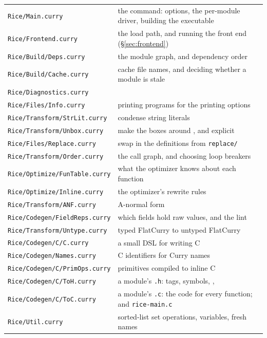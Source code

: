 \documentclass[11pt]{article}
\newcommand{\code}[1]{\texttt{\detokenize{#1}}}
\newcommand{\file}[1]{\nolinkurl{#1}}
\begin{document}
\begin{longtable}{@{}p{}p{}@{}}
\toprule
\file{Rice/Main.curry} & the \code{rice} command: options, the per-module
  driver, building the executable \\
\file{Rice/Frontend.curry} & the load path, and running the front end
  (\S\ref{sec:frontend}) \\
\file{Rice/Build/Deps.curry} & the module graph, and dependency order \\
\file{Rice/Build/Cache.curry} & cache file names, and deciding whether a module
  is stale \\
\file{Rice/Diagnostics.curry} & \code{--compiler-time} \\
\file{Rice/Files/Info.curry} & printing programs for the printing options \\
\file{Rice/Transform/StrLit.curry} & condense string literals \\
\file{Rice/Transform/Unbox.curry} & make the boxes around \code{Int},
  \code{Char} and \code{Float} explicit \\
\file{Rice/Files/Replace.curry} & swap in the definitions from \file{replace/} \\
\file{Rice/Transform/Order.curry} & the call graph, and choosing loop breakers \\
\file{Rice/Optimize/FunTable.curry} & what the optimizer knows about each
  function \\
\file{Rice/Optimize/Inline.curry} & the optimizer's rewrite rules \\
\file{Rice/Transform/ANF.curry} & A-normal form \\
\file{Rice/Codegen/FieldReps.curry} & which fields hold raw values, and the lint \\
\file{Rice/Transform/Untype.curry} & typed FlatCurry to untyped FlatCurry \\
\file{Rice/Codegen/C/C.curry} & a small DSL for writing C \\
\file{Rice/Codegen/Names.curry} & C identifiers for Curry names \\
\file{Rice/Codegen/C/PrimOps.curry} & primitives compiled to inline C \\
\file{Rice/Codegen/C/ToH.curry} & a module's \file{.h}: tags, symbols,
  \code{make_X}, \code{set_X} \\
\file{Rice/Codegen/C/ToC.curry} & a module's \file{.c}: the code for every
  function; and \file{rice-main.c} \\
\file{Rice/Util.curry} & sorted-list set operations, variables, fresh names \\
\bottomrule
\end{longtable}
\end{document}
